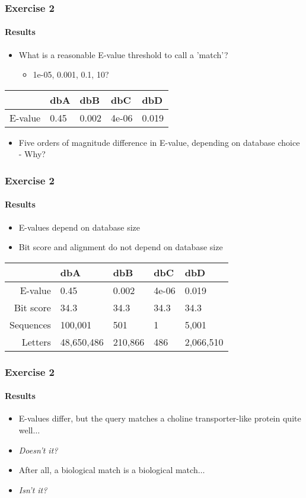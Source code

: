 \begin{frame}
  \frametitle{Exercise 2}
  \framesubtitle{Results}
  \begin{itemize}
    \item What is a reasonable E-value threshold to call a 'match'?
    \begin{itemize}
      \item 1e-05, 0.001, 0.1, 10?
    \end{itemize}
  \end{itemize}
  \begin{center}
  \begin{tabular}{r|l|l|l|l}
	   & dbA & dbB & dbC & dbD \\
	  \hline
	  \hline
	  E-value & 0.45 & 0.002 & 4e-06 & 0.019 \\
  \end{tabular}
  \end{center}
  \begin{itemize}
    \item Five orders of magnitude difference in E-value, depending on database choice - Why?
  \end{itemize}    
\end{frame}

\begin{frame}
  \frametitle{Exercise 2}
  \framesubtitle{Results}
  \begin{itemize}
    \item E-values depend on database size
    \item Bit score and alignment do not depend on database size
  \end{itemize}
  \begin{center}
  \begin{tabular}{r|l|l|l|l}
	   & dbA & dbB & dbC & dbD \\
	  \hline
	  \hline
	  E-value & 0.45 & 0.002 & 4e-06 & 0.019 \\
	  Bit score & 34.3 & 34.3 & 34.3 & 34.3 \\
	  \hline
	  Sequences & 100,001 & 501 & 1 & 5,001 \\
	  Letters & 48,650,486 & 210,866 & 486 & 2,066,510 	  
  \end{tabular}
  \end{center}
\end{frame}

\begin{frame}
  \frametitle{Exercise 2}
  \framesubtitle{Results}    
  \begin{itemize}
    \item<1-> E-values differ, but the query matches a choline transporter-like 
protein quite well$\ldots$
    \item<2-> \emph{Doesn't it?}
    \item<1-> After all, a biological match is a biological match$\ldots$
    \item<2-> \emph{Isn't it?}
  \end{itemize}
\end{frame}

